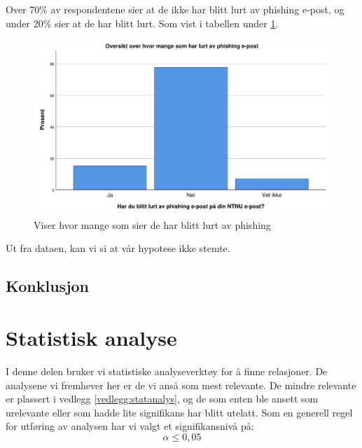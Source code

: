 Over 70\% av respondentene sier at de ikke har blitt lurt av phishing e-post, og under 20\% sier at de har blitt lurt. Som vist i tabellen under \ref{fig:lurt-av-phishing}. 
\begin{figure}[H]
    \centering
    \includegraphics[scale=0.5]{case_2/bilder/spss/lurt_phish.pdf}
    \caption[lurt-av-phishing]{Viser hvor mange som sier de har blitt lurt av phishing}
    \label{fig:lurt-av-phishing}
\end{figure}
Ut fra dataen, kan vi si at vår hypotese ikke stemte.   

\subsection{Konklusjon}


\section{Statistisk analyse}
I denne delen bruker vi statistiske analyseverktøy for å finne relasjoner. De analysene vi fremhever her er de vi anså som mest relevante. De mindre relevante er plassert i vedlegg \ref{vedlegg:statanalys}, og de som enten ble ansett som urelevante eller som hadde lite signifikans har blitt utelatt. Som en generell regel for utføring av analysen har vi valgt et signifikansnivå på: \[\alpha \leq 0,05\]

